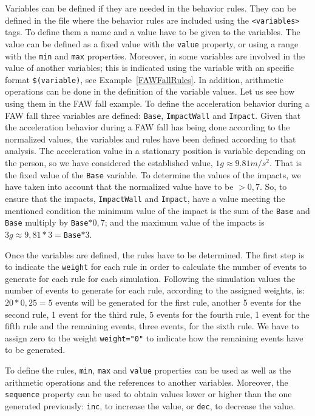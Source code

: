 \documentclass[10pt,journal,compsoc]{IEEEtran}
\begin{document}
Variables can be defined if they are needed in the behavior rules. They can be defined in the file where the behavior rules are included using the \texttt{<variables>} tags. To define them a name and a value 
have to be given to the variables. The value can be defined as a fixed value with the \texttt{value} property, or using a range with the \texttt{min} and \texttt{max} properties. Moreover, in some variables
are involved in the value of another variables; this is indicated using the variable with an specific format \texttt{\$(variable)}, see Example~\ref{FAWFallRules}. In addition, arithmetic operations can be done in the definition of the variable values. Let us see how using them in the FAW fall example. To define the acceleration behavior during a FAW fall three variables are defined: \texttt{Base}, 
\texttt{ImpactWall} and \texttt{Impact}. Given that the acceleration behavior during a FAW fall has being done according to the normalized values, the variables and rules have been defined according to that analysis. The acceleration value in a stationary position is variable depending on the person, so we have considered the established value, $1g\approx9.81m/s^{2}$. That is the fixed value of the \texttt{Base} variable. To determine the values of the impacts, we have taken into account that the 
normalized value have to be $> 0,7$. So, to ensure that the impacts, \texttt{ImpactWall} and \texttt{Impact}, have a value meeting the mentioned condition the minimum value of the impact is the sum of the \texttt{Base} and \texttt{Base} multiply by \texttt{Base}$*0,7$; and the maximum value of the impacts is $3g\approx9,81*3=$\texttt{Base}$*3$.

Once the variables are defined, the rules have to be determined. The first step is to indicate the \texttt{weight} for each rule in order to calculate the number of events to generate for each rule for each simulation. Following the simulation values the number of events to generate for each rule, according to the assigned weights, is: $20 * 0,25 = 5$ events will be generated for the first rule, another 5 events 
for the second rule, 1 event for the third rule, 5 events for the fourth rule, 1 event for the fifth rule and the remaining events, three events, for the sixth rule. We have to assign zero to the weight \texttt{weight="0"} to indicate how the remaining events have to be generated.

To define the rules, \texttt{min}, \texttt{max} and \texttt{value} properties can be used as well as the arithmetic operations and the references to another variables. Moreover, the \texttt{sequence} property can be used to obtain values lower or higher than the one generated previously: \texttt{inc}, to increase the value, or \texttt{dec}, to decrease the value. 
\end{document}
